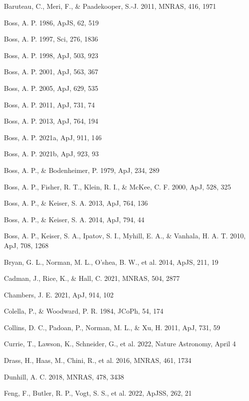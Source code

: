 \documentclass[12pt,preprint]{aastex}
\begin{document}
\begin{references}

Baruteau, C., Meri, F., \& Paadekooper, S.-J. 2011, MNRAS, 416, 1971

Boss, A. P. 1986, ApJS, 62, 519

Boss, A. P. 1997, Sci, 276, 1836

Boss, A. P. 1998, ApJ, 503, 923

Boss, A. P. 2001, ApJ, 563, 367

Boss, A. P. 2005, ApJ, 629, 535

Boss, A. P. 2011, ApJ, 731, 74

Boss, A. P. 2013, ApJ, 764, 194

Boss, A. P. 2021a, ApJ, 911, 146

Boss, A. P. 2021b, ApJ, 923, 93

Boss, A. P., \& Bodenheimer, P. 1979, ApJ, 234, 289

Boss, A. P., Fisher, R. T., Klein, R. I., \& McKee, C. F. 2000, ApJ, 528, 325

Boss, A. P., \& Keiser, S. A. 2013, ApJ, 764, 136

Boss, A. P., \& Keiser, S. A. 2014, ApJ, 794, 44

Boss, A. P., Keiser, S. A., Ipatov, S. I., Myhill, E. A., \& Vanhala, H. A. T.
2010, ApJ, 708, 1268

Bryan, G. L., Norman, M. L., O'shea, B. W., et al. 2014, ApJS, 211, 19

Cadman, J., Rice, K., \& Hall, C. 2021, MNRAS, 504, 2877

Chambers, J. E. 2021, ApJ, 914, 102

Colella, P., \& Woodward, P. R. 1984, JCoPh, 54, 174

Collins, D. C., Padoan, P., Norman, M. L., \& Xu, H. 2011, ApJ, 731, 59

Currie, T., Lawson, K., Schneider, G., et al. 2022, Nature Astronomy, April 4

Drass, H., Haas, M., Chini, R., et al. 2016, MNRAS, 461, 1734

Dunhill, A. C. 2018, MNRAS, 478, 3438

Feng, F., Butler, R. P., Vogt, S. S., et al. 2022, ApJSS, 262, 21


\end{references}
\end{document}
